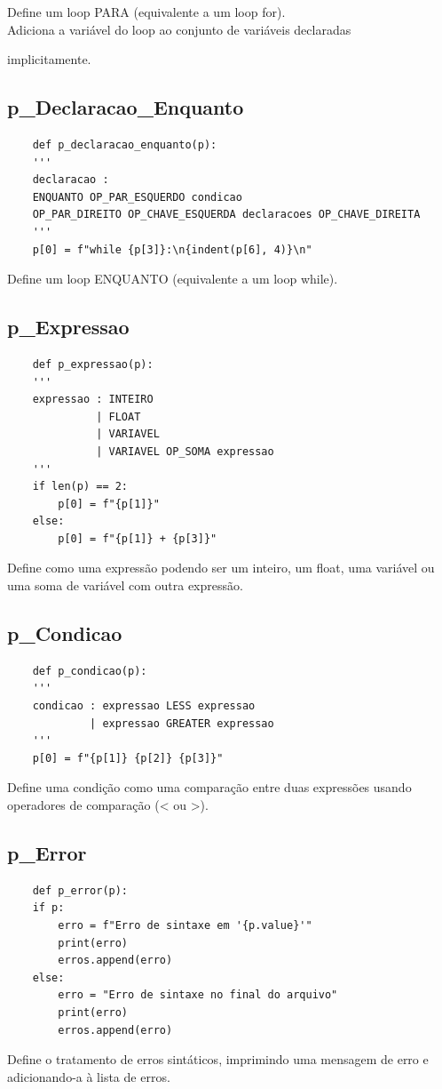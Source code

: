 \documentclass[a4paper,12pt]{article}
\begin{document}
Define um loop PARA (equivalente a um loop for).\\
Adiciona a variável do loop ao conjunto de variáveis declaradas 

implicitamente.

\subsection{p\_Declaracao\_Enquanto}

\begin{verbatim}
    def p_declaracao_enquanto(p):
    '''
    declaracao : 
    ENQUANTO OP_PAR_ESQUERDO condicao 
    OP_PAR_DIREITO OP_CHAVE_ESQUERDA declaracoes OP_CHAVE_DIREITA
    '''
    p[0] = f"while {p[3]}:\n{indent(p[6], 4)}\n"
\end{verbatim}
Define um loop ENQUANTO (equivalente a um loop while).

\subsection{p\_Expressao}
\begin{verbatim}
    def p_expressao(p):
    '''
    expressao : INTEIRO
              | FLOAT
              | VARIAVEL
              | VARIAVEL OP_SOMA expressao
    '''
    if len(p) == 2:
        p[0] = f"{p[1]}"
    else:
        p[0] = f"{p[1]} + {p[3]}"
\end{verbatim}
Define como uma expressão podendo ser um inteiro, um float, uma variável 
ou uma soma de variável com outra expressão.

\subsection{p\_Condicao}
\begin{verbatim}
    def p_condicao(p):
    '''
    condicao : expressao LESS expressao
             | expressao GREATER expressao
    '''
    p[0] = f"{p[1]} {p[2]} {p[3]}"
\end{verbatim}
Define uma condição como uma comparação entre duas expressões usando 
operadores de comparação (< ou >).
\subsection{p\_Error}
\begin{verbatim}
    def p_error(p):
    if p:
        erro = f"Erro de sintaxe em '{p.value}'"
        print(erro)
        erros.append(erro)
    else:
        erro = "Erro de sintaxe no final do arquivo"
        print(erro)
        erros.append(erro)
\end{verbatim}
Define o tratamento de erros sintáticos, imprimindo uma mensagem de erro 
e adicionando-a à lista de erros.
\end{document}
